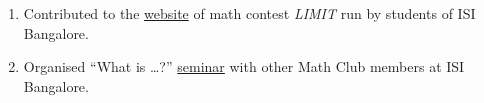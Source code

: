 \documentclass[a4paper, oneside, final]{scrartcl} %
\begin{document}
\begin{enumerate}[label = $\bullet$]
  \item Contributed to the \href{https://www.limitisi.in}{website} of math contest \textit{LIMIT} run by students of ISI Bangalore.
  \item Organised ``What is \dots ?'' \href{https://mathclubisib.github.io/seminars/what_is/}{seminar} with other Math Club members at ISI Bangalore.

\end{enumerate}

\end{document}
